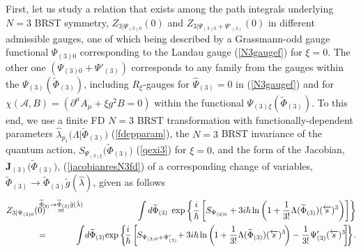 \documentclass[10pt]{article}
\begin{document}
First, let us study a relation that exists among the path integrals underlying $N=3$ BRST symmetry,
$Z_{3|\Psi_{(3)0}}(0)$ and $Z_{3|\Psi_{(3)0}+\Psi'_{(3)}}(0)$
in different admissible gauges,  one of which being described
by a Grassmann-odd  gauge functional $\Psi_{(3)0}$  corresponding to
the Landau gauge (\ref{N3gaugef}) for $\xi=0$. The other one $(\Psi_{(3)0}+\Psi'_{(3)})$
corresponds to any family from the gauges within the $\Psi_{(3)}(\widetilde{\Phi}_{(3)})$, including $R_\xi$-gauges
 for $\widehat{\Psi}_{(3)}=0$ in (\ref{N3gaugef}) and for $\chi(\mathcal{A},B)=(\partial^\mu A_{\mu}+\xi g^2 B=0) $ within the functional $\Psi_{(3)\xi}(\widetilde{\Phi}_{(3)})$.
To this end, we use a finite FD $N=3$ BRST transformation with
functionally-dependent parameters $\hat{\lambda}_{p_1}\big(\Lambda|\widetilde{\Phi}_{(3)}\big)$ (\ref{fdepparam}),  the $N=3$ BRST invariance of the quantum
action,  $
  S_{\Psi_{(3)\xi}}\big(\widetilde{\Phi}_{(3)}\big)$ (\ref{qexi3})  for $\xi=0$, and the form of the Jacobian, $\mathbf{J}_{(3)}\big(\widetilde{\Phi}_{(3)}\big)$,
(\ref{jacobianresN3fd}) of a corresponding change of variables,
$\widetilde{\Phi}_{(3)} \to \widetilde{\Phi}_{(3)}\tilde{g}(\hat{\lambda})$, given as follows
\begin{eqnarray}
 Z_{3|\Psi_{(3)0}}(0) & \hspace{-1em}\stackrel{\widetilde{\Phi}_{3)} \rightarrow \widetilde{\Phi}_{(3)}\tilde{g}(\hat{\lambda})}{=}& \hspace{-1em}\int  d \widetilde{\Phi}_{(3)}\;\exp\left\{  \frac{i}{\hbar}  \left[
 S_{\Psi_{(3)0}} +3 i\hbar\,\mathrm{\ln}\left(
1+ \frac{1}{3!}\Lambda (\widetilde{\Phi}_{(3)})(\overleftarrow{s})^{3}\right)  \right]  \right\} \nonumber \\
   &\hspace{-1em}=& \hspace{-1.8em} \int \hspace{-0.15em}d\widetilde{\Phi}_{(3)}\hspace{-0.15em}\exp\left\{ \hspace{-0.2em} \frac{i}{\hbar}  \left[\hspace{-0.1em}
 S_{\Psi_{(3)0}+\Psi'_{(3)}} \hspace{-0.2em}+ 3i\hbar\,\mathrm{\ln}\left(\hspace{-0.1em}
1+ \frac{1}{3!}\Lambda (\widetilde{\Phi}_{(3)})(\overleftarrow{s})^{3}\hspace{-0.15em}\right)
-\frac{1}{3!} \Psi'_{(3)}  (\overleftarrow{s})^{3} \hspace{-0.2em}\right]  \hspace{-0.2em}\right\}\hspace{-0.1em}.
\label{zfDtrans3}
\end{eqnarray}
\end{document}
